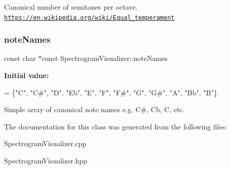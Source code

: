 Canonical number of semitones per octave. \href{https://en.wikipedia.org/wiki/Equal_temperament}{\tt https\+://en.\+wikipedia.\+org/wiki/\+Equal\+\_\+temperament} \hypertarget{structSpectrogramVisualizer_ad833647df19d8ae0eb2e47efe989d1d9}{}\label{structSpectrogramVisualizer_ad833647df19d8ae0eb2e47efe989d1d9} 
\subsubsection{\texorpdfstring{note\+Names}{noteNames}}
{\ttfamily const char $\ast$const Spectrogram\+Visualizer\+::note\+Names\hspace{0.3cm}{\ttfamily [static]}}

{\bfseries Initial value\+:}
\begin{DoxyCode}
= \{\textcolor{stringliteral}{"C"}, \textcolor{stringliteral}{"C#"}, \textcolor{stringliteral}{"D"}, \textcolor{stringliteral}{"Eb"}, \textcolor{stringliteral}{"E"}, \textcolor{stringliteral}{"F"}, \textcolor{stringliteral}{"F#"}, \textcolor{stringliteral}{"G"}, \textcolor{stringliteral}{"G#"}, \textcolor{stringliteral}{"A"}, \textcolor{stringliteral}{"Bb"},
                                                        \textcolor{stringliteral}{"B"}\}
\end{DoxyCode}
Simple array of canonical note names e.\+g. C\#, Cb, C, etc. 

The documentation for this class was generated from the following files\+:\begin{DoxyCompactItemize}
\item 
Spectrogram\+Visualizer.\+cpp\item 
Spectrogram\+Visualizer.\+hpp\end{DoxyCompactItemize}
